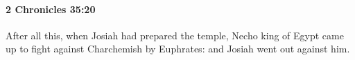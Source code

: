 
		\paragraph{2 Chronicles 35:20} %
			\label{2CHRONICLES-35-20}

			After all this, when Josiah had prepared the temple, Necho king of Egypt came up to fight against Charchemish by Euphrates: and Josiah went out against him.


